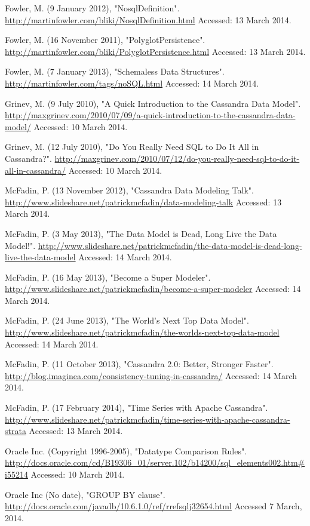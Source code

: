 \documentclass[letterpaper]{article}
\begin{document}
Fowler, M. (9 January 2012), "NosqlDefinition".
\url{http://martinfowler.com/bliki/NosqlDefinition.html}
Accessed: 13 March 2014.

Fowler, M. (16 November 2011), "PolyglotPersistence".
\url{http://martinfowler.com/bliki/PolyglotPersistence.html}
Accessed: 13 March 2014.

Fowler, M. (7 January 2013), "Schemaless Data Structures".
\url{http://martinfowler.com/tags/noSQL.html}
Accessed: 14 March 2014.

Grinev, M. (9 July 2010), "A Quick Introduction to the Cassandra Data Model".
\url{http://maxgrinev.com/2010/07/09/a-quick-introduction-to-the-cassandra-data-model/}
Accessed: 10 March 2014.

Grinev, M. (12 July 2010), "Do You Really Need SQL to Do It All in Cassandra?".
\url{ http://maxgrinev.com/2010/07/12/do-you-really-need-sql-to-do-it-all-in-cassandra/}
Accessed: 10 March 2014.

McFadin, P. (13 November 2012), "Cassandra Data Modeling Talk".
\url{http://www.slideshare.net/patrickmcfadin/data-modeling-talk}
Accessed: 13 March 2014.

McFadin, P. (3 May 2013), "The Data Model is Dead, Long Live the Data Model!".
\url{http://www.slideshare.net/patrickmcfadin/the-data-model-is-dead-long-live-the-data-model}
Accessed: 14 March 2014.

McFadin, P. (16 May 2013), "Become a Super Modeler".
\url{http://www.slideshare.net/patrickmcfadin/become-a-super-modeler}
Accessed: 14 March 2014.

McFadin, P. (24 June 2013), "The World's Next Top Data Model".
\url{http://www.slideshare.net/patrickmcfadin/the-worlds-next-top-data-model}
Accessed: 14 March 2014.

McFadin, P. (11 October 2013), "Cassandra 2.0: Better, Stronger Faster".
\url{http://blog.imaginea.com/consistency-tuning-in-cassandra/}
Accessed: 14 March 2014.

McFadin, P. (17 February 2014), "Time Series with Apache Cassandra".
\url{http://www.slideshare.net/patrickmcfadin/time-series-with-apache-cassandra-strata}
Accessed: 13 March 2014.

Oracle Inc. (Copyright 1996-2005), "Datatype Comparison Rules".
\url{http://docs.oracle.com/cd/B19306_01/server.102/b14200/sql_elements002.htm#i55214}
Accessed: 10 March 2014.

Oracle Inc (No date), "GROUP BY clause".
\url{http://docs.oracle.com/javadb/10.6.1.0/ref/rrefsqlj32654.html}
Accessed 7 March, 2014.
\end{document}
